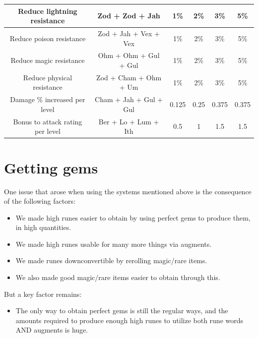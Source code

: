 \documentclass[12pt,a4paper]{article}
\begin{document}
\begin{center}
{\begin{tabular}{|c|c|c|c|c|c|}
\hline
Reduce lightning resistance&Zod + Zod + Jah&1\%&2\%&3\%&5\%\\
\hline
Reduce poison resistance&Zod + Jah + Vex + Vex&1\%&2\%&3\%&5\%\\
\hline
Reduce magic resistance&Ohm + Ohm + Gul + Gul&1\%&2\%&3\%&5\%\\
\hline
Reduce physical resistance&Zod + Cham + Ohm + Um&1\%&2\%&3\%&5\%\\
\hline
Damage \% increased per level&Cham + Jah + Gul + Gul&0.125&0.25&0.375&0.375\\
\hline
Bonus to attack rating per level&Ber + Lo + Lum + Ith&0.5&1&1.5&1.5\\
\hline
\end{tabular}
}
\end{center}

\section{Getting gems}

One issue that arose when using the systems mentioned above is the consequence of the following factors:

\begin{itemize}

\item We made high runes easier to obtain by using perfect gems to produce them, in high quantities.
\item We made high runes usable for many more things via augments.
\item We made runes downconvertible by rerolling magic/rare items.
\item We also made good magic/rare items easier to obtain through this.

\end{itemize}

But a key factor remains:

\begin{itemize}

\item The only way to obtain perfect gems is still the regular ways, and the amounts required to produce enough high runes to utilize both rune words AND augments is huge.

\end{itemize}
\end{document}
